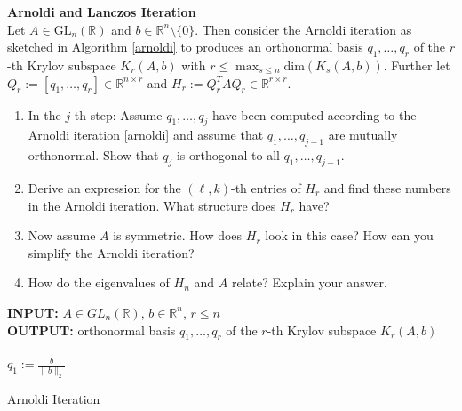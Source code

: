 \textbf{Arnoldi and Lanczos Iteration}\\
Let $A\in \text{GL}_n(\mathbb{R})$ and $b\in\mathbb{R}^n\setminus \{0\}$. Then consider the Arnoldi iteration as sketched in Algorithm \ref{arnoldi} to produces an orthonormal basis $q_1,\ldots, q_r$ of the $r$-th Krylov subspace $K_r(A,b)$ with $r \leq \max_{s\leq n} \text{dim}(K_s(A,b))$. Further let $Q_r := [q_1,\ldots, q_{r}] \in \mathbb{R}^{n \times r}$ and $H_r := Q_r^TAQ_r \in \mathbb{R}^{r\times r}$.
\begin{enumerate}
	\item In the $j$-th step: Assume $q_1,\ldots, q_{j}$ have been computed according to the Arnoldi iteration \ref{arnoldi} and assume that $q_1,\ldots, q_{j-1}$ are mutually orthonormal. Show that $q_j$ is orthogonal to all $q_1,\ldots, q_{j-1}$.
	\item Derive an expression for the $(\ell,k)$-th entries of $H_r$ and find these numbers in the Arnoldi iteration. What structure does $H_r$ have?
	\item Now assume $A$ is symmetric. How does $H_r$ look in this case? How can you simplify the Arnoldi iteration?
	\item How do the eigenvalues of $H_n$ and $A$ relate? Explain your answer.
\end{enumerate}
%
\begin{algorithm}
		\textbf{INPUT:} $A\in GL_n(\mathbb{R})$, $b \in \mathbb{R}^n$, $r\leq n$\\
	\textbf{OUTPUT:} orthonormal basis $q_1,\ldots, q_r$ of the $r$-th Krylov subspace $K_r(A,b)$\\~\\
	$q_1 := \frac{b}{\|b\|_2}$\\

\caption{Arnoldi Iteration}
\label{arnoldi}
\end{algorithm}	
